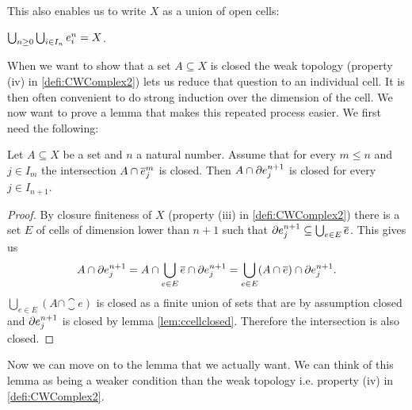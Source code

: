 This also enables us to write $X$ as a union of open cells:

\begin{cor}
    $\bigcup_{n \ge 0}\bigcup_{i \in I_n} \ocell{n}{i} = X$.
\end{cor}

When we want to show that a set $A \subseteq X$ is closed the weak topology (property (iv) in \ref{defi:CWComplex2}) lets us reduce that question to an individual cell. 
It is then often convenient to do strong induction over the dimension of the cell. 
We now want to prove a lemma that makes this repeated process easier.
We first need the following: 

\begin{lem}\label{lem:inductionecellclosed}
    Let $A \subseteq X$ be a set and $n$ a natural number. 
    Assume that for every $m \le n$ and $j \in I_m$ the intersection $A \cap \ccell{m}{j}$ is closed.
    Then $A \cap \ecell{n + 1}{j}$ is closed for every $j \in I_{n + 1}$.
\end{lem}
\begin{proof}
    By closure finiteness of $X$ (property (iii) in \ref{defi:CWComplex2}) there is a set $E$ of cells of dimension lower than $n + 1$ such that $\ecell{n + 1}{j} \subseteq \bigcup_{e \in E}\closure{e}$.
    This gives us 
    \[A \cap \ecell{n + 1}{j} = A \cap \bigcup_{e \in E}\closure{e} \cap \ecell{n + 1}{j} = \bigcup_{e \in E}(A \cap \closure{e}) \cap \ecell{n + 1}{j}.\]
    $\bigcup_{e \in E}(A \cap \closure{e})$ is closed as a finite union of sets that are by assumption closed and $\ecell{n + 1}{j}$ is closed by lemma \ref{lem:ccellclosed}. Therefore the intersection is also closed.
\end{proof}

Now we can move on to the lemma that we actually want.
We can think of this lemma as being a weaker condition than the weak topology i.e. property (iv) in \ref{defi:CWComplex2}.

